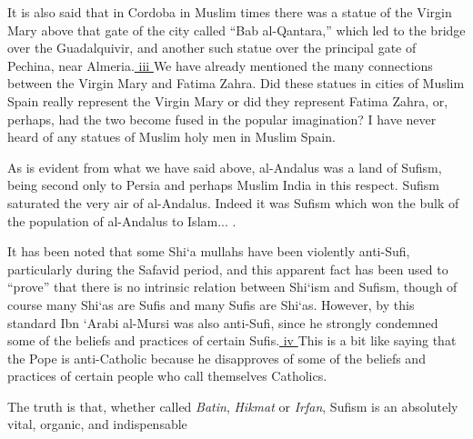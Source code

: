 It is also said that in Cordoba in Muslim times there was a statue of the Virgin Mary above that gate of the city called ``Bab al-Qantara,'' which led to the bridge over the Guadalquivir, and another such statue over the principal gate of Pechina, near Almeria.\hyperref[_edn3]{ iii } We have already mentioned the many connections between the Virgin Mary and Fatima Zahra. Did these statues in cities of Muslim Spain really represent the Virgin Mary or did they represent Fatima Zahra, or, perhaps, had the two become fused in the popular imagination? I have never heard of any statues of Muslim holy men in Muslim Spain.

As is evident from what we have said above, al-Andalus was a land of Sufism, being second only to Persia and perhaps Muslim India in this respect. Sufism saturated the very air of al-Andalus. Indeed it was Sufism which won the bulk of the population of al-Andalus to Islam... .

It has been noted that some Shi`a mullahs have been violently anti-Sufi, particularly during the Safavid period, and this apparent fact has been used to ``prove'' that there is no intrinsic relation between Shi`ism and Sufism, though of course many Shi`as are Sufis and many Sufis are Shi`as. However, by this standard Ibn `Arabi al-Mursi was also anti-Sufi, since he strongly condemned some of the beliefs and practices of certain Sufis.\hyperref[_edn4]{ iv } This is a bit like saying that the Pope is anti-Catholic because he disapproves of some of the beliefs and practices of certain people who call themselves Catholics.

The truth is that, whether called \emph{Batin}, \emph{Hikmat} or
\emph{Irfan}, Sufism is an absolutely vital, organic, and indispensable

